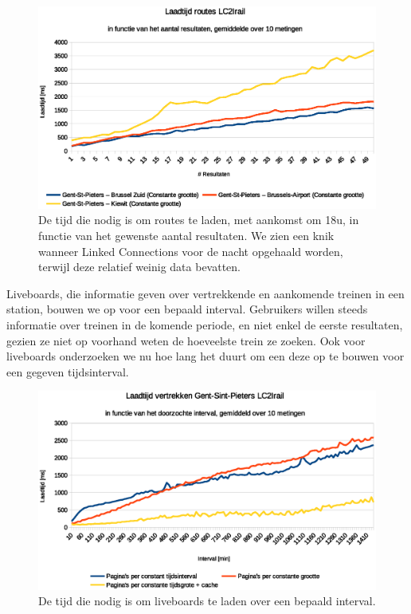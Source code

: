 \begin{figure}[h]
	\centering
	\includegraphics[width=1.00\textwidth]{images/Laadtijd_routes.eps}
	\caption[Laadtijd routes in functie van aantal resultaten]{De tijd die nodig is om routes te laden, met aankomst om 18u, in functie van het gewenste aantal resultaten. We zien een knik wanneer Linked Connections voor de nacht opgehaald worden, terwijl deze relatief weinig data bevatten.}
	\label{fig:responsetimeperresultsroute}
\end{figure}

Liveboards, die informatie geven over vertrekkende en aankomende treinen in een station, bouwen we op voor een bepaald interval. Gebruikers willen steeds informatie over treinen in de komende periode, en niet enkel de eerste resultaten, gezien ze niet op voorhand weten de hoeveelste trein ze zoeken. Ook voor liveboards onderzoeken we nu hoe lang het duurt om een deze op te bouwen voor een gegeven tijdsinterval. %

\begin{figure}[h]
	\centering
	\includegraphics[width=1.0\textwidth]{images/Laadtijd_vertrekken.eps}
	\caption[Laadtijd liveboards in functie van het overlopen interval]{De tijd die nodig is om liveboards te laden over een bepaald interval.}
	\label{fig:responsetimeperintervalliveboards}
\end{figure}

